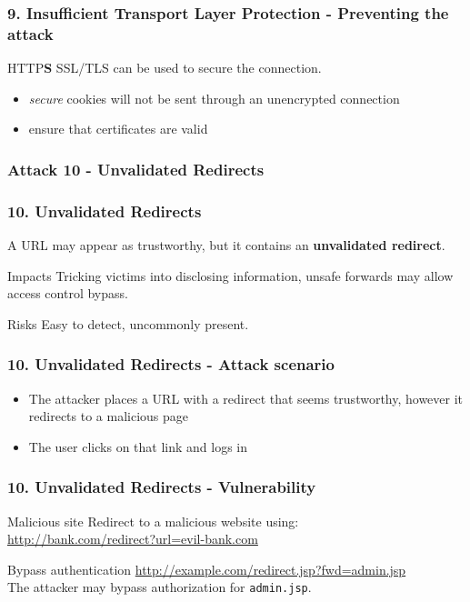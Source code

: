 \begin{frame}
\frametitle{9. Insufficient Transport Layer Protection - Preventing the attack}
\begin{block}{HTTP\textbf{S}}
SSL/TLS can be used to secure the connection.
\begin{itemize}
\item \emph{secure} cookies will not be sent through an unencrypted connection
\item ensure that certificates are valid
\end{itemize}
\end{block}
\end{frame}

\subsubsection{Attack 10 - Unvalidated Redirects}

\begin{frame}
\frametitle{10. Unvalidated Redirects}
A URL may appear as trustworthy, but it contains an \textbf{unvalidated
redirect}.
\begin{block}{Impacts}
Tricking victims into disclosing information, unsafe forwards may allow access
control bypass.
\end{block}
\begin{block}{Risks}
Easy to detect, uncommonly present.
\end{block}
\end{frame}

\begin{frame}
\frametitle{10. Unvalidated Redirects - Attack scenario}
\begin{itemize}
\item The attacker places a URL with a redirect that seems trustworthy,
	however it redirects to a malicious page
\item The user clicks on that link and logs in
\end{itemize}
\end{frame}

\begin{frame}
\frametitle{10. Unvalidated Redirects - Vulnerability}
\begin{exampleblock}{Malicious site}
Redirect to a malicious website using:
\\ \url{http://bank.com/redirect?url=evil-bank.com}
\end{exampleblock}
\begin{exampleblock}{Bypass authentication}
\url{http://example.com/redirect.jsp?fwd=admin.jsp}
\\ The attacker may bypass authorization for \texttt{admin.jsp}.
\end{exampleblock}
\end{frame}

